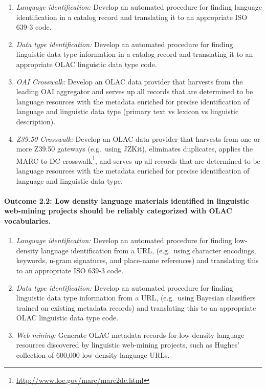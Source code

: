 \begin{enumerate}[label=\emph{\task\alph*}]\setlength{\itemsep}{0pt}
\item \emph{Language identification:}
  Develop an automated procedure for finding
  language identification in a catalog record and translating it to an
  appropriate ISO 639-3 code.
\item \emph{Data type identification:}
  Develop an automated procedure for finding
  linguistic data type information in a catalog record and translating
  it to an appropriate OLAC linguistic data type code.
\item \emph{OAI Crosswalk:}
  Develop an OLAC data provider that harvests from the
  leading OAI aggregator and serves up all records that are determined to
  be language resources with the metadata enriched for precise
  identification of language and linguistic data type (primary text vs
  lexicon vs linguistic description).
\item \emph{Z39.50 Crosswalk:}
  Develop an OLAC data provider that harvests from one or more
  Z39.50 gateways (e.g.~using JZKit), eliminates duplicates,
  applies the MARC to DC crosswalk\footnote{\scriptsize\url{http://www.loc.gov/marc/marc2dc.html}},
  and serves up all records that are determined to
  be language resources with the metadata enriched for precise
  identification of language and linguistic data type.
\end{enumerate}


\def\task{2.2}
\paragraph{Outcome {\task}: Low density language materials identified in
  linguistic web-mining projects should be reliably categorized with OLAC vocabularies.}

\begin{enumerate}[label=\emph{\task\alph*}]\setlength{\itemsep}{0pt}
\item \emph{Language identification:}
  Develop an automated procedure for finding
  low-density language identification from a URL,
  (e.g.~using character encodings, keywords,
  n-gram signatures, and place-name references)
  and translating this to an appropriate ISO 639-3 code.
\item \emph{Data type identification:}
  Develop an automated procedure for finding
  linguistic data type information from a URL,
  (e.g.~using Bayesian classifiers trained on existing metadata records)
  and translating this to an appropriate OLAC linguistic data type code.
\item \emph{Web mining:}
  Generate OLAC metadata records for low-density
  language resources discovered by linguistic web-mining projects,
  such as Hughes' collection of 600,000 low-density language URLs.
\end{enumerate}

